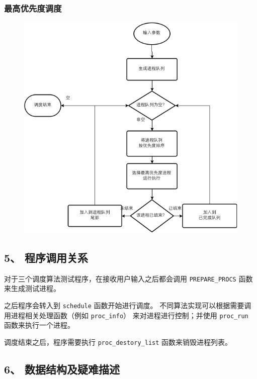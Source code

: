 \documentclass[12bp]{guo}
\begin{document}
\subsubsection{最高优先度调度}

\begin{figure}[h!]
    \centering
        \includegraphics[scale=0.75]{figures/1.flow.priority.png}
\end{figure}


\subsection{5、 程序调用关系}

对于三个调度算法测试程序，在接收用户输入之后都会调用
\texttt{PREPARE_PROCS} 函数来生成测试进程。


之后程序会转入到 \texttt{schedule} 函数开始进行调度。
不同算法实现可以根据需要调用进程相关处理函数（例如 \texttt{proc_info}）
来对进程进行控制；并使用 \texttt{proc_run} 函数来执行一个进程。


调度结束之后，程序需要执行 \texttt{proc_destory_list} 函数来销毁进程列表。


\subsection{6、 数据结构及疑难描述}
\end{document}
